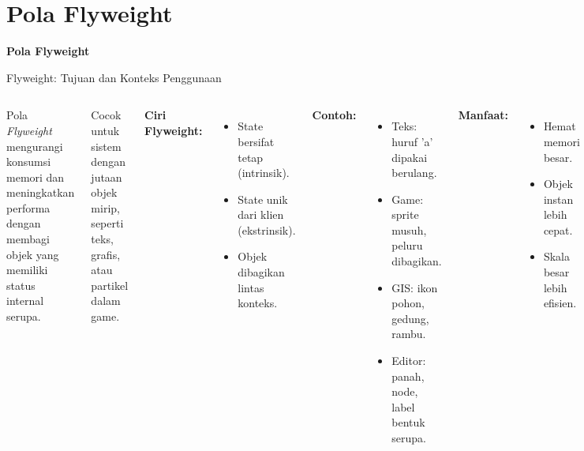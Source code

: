 \documentclass[aspectratio=169, table]{beamer}
\begin{document}
\section{Pola Flyweight}

\begin{frame}{\hfill}
	\centering
	\textbf{\Huge{Pola Flyweight}}
\end{frame}


\begin{frame}{Flyweight: Tujuan dan Konteks Penggunaan}
	\vspace{20pt}
	\begin{columns}[T]
		Pola \textit{Flyweight} mengurangi konsumsi memori dan meningkatkan performa dengan membagi objek yang memiliki status internal serupa.
		
		Cocok untuk sistem dengan jutaan objek mirip, seperti teks, grafis, atau partikel dalam game.
		
		\vspace{8pt}
		\textbf{Ciri Flyweight:}
		\begin{itemize}
			\item State bersifat tetap (intrinsik).
			\item State unik dari klien (ekstrinsik).
			\item Objek dibagikan lintas konteks.
		\end{itemize}
		
		\textbf{Contoh:}
		\begin{itemize}
			\item Teks: huruf 'a' dipakai berulang.
			\item Game: sprite musuh, peluru dibagikan.
			\item GIS: ikon pohon, gedung, rambu.
			\item Editor: panah, node, label bentuk serupa.
		\end{itemize}
		
		\vspace{5pt}
		\textbf{Manfaat:}
		\begin{itemize}
			\item Hemat memori besar.
			\item Objek instan lebih cepat.
			\item Skala besar lebih efisien.
		\end{itemize}
	\end{columns}
\end{frame}
\end{document}
